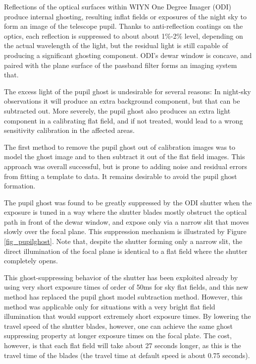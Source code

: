 \documentclass[draft]{spieman}
\begin{document}
Reflections of the optical surfaces within WIYN One Degree Imager (ODI) produce
internal ghosting, resulting inflat fields or exposures of the night sky to form
an image of the telescope pupil. Thanks to anti-reflection coatings on the
optics, each reflection is suppressed to about about 1\%-2\% level, depending on
the actual wavelength of the light, but the residual light is still capable of
producing a significant ghosting component. ODI’s dewar window is concave, and
paired with the plane surface of the passband filter forms an imaging system
that.

The excess light of the pupil ghost is undesirable for several reasons: In
night-sky observations it will produce an extra background component, but that
can be subtracted out. More severely, the pupil ghost also produces an extra
light component in a calibrating flat field, and if not treated, would lead to a
wrong sensitivity calibration in the affected areas.

The first method to remove the pupil ghost out of calibration images was to
model the ghost image and to then subtract it out of the flat field images. This
approach was overall successful, but is prone to adding noise and residual
errors from fitting a template to data. It remains desirable to avoid the pupil
ghost formation.

The pupil ghost was found to be greatly suppressed by the ODI shutter when the
exposure is tuned in a way where the shutter blades mostly obstruct the optical
path in front of the dewar window, and expose only via a narrow slit that moves
slowly over the focal plane. This suppression mechanism is illustrated by Figure
\ref{fig_pupilghost}. Note that, despite the shutter forming only a narrow slit,
the direct illumination of the focal plane is identical to a flat field where
the shutter completely opens.

This ghost-suppressing behavior of the shutter has been exploited already by
using very short exposure times of order of 50ms for sky flat fields, and this
new method has replaced the pupil ghost model subtraction method. However,
 this method was applicable only for situations with a very
bright flat field illumination that would support extremely short exposure
times. By lowering the travel speed of the shutter blades, however, one can
achieve the same ghost suppressing property at longer exposure times on the
focal plate. The cost, however, is that each flat field will take about 27
seconds longer, as this is the travel time of the blades (the travel time at
default speed is about 0.75 seconds).
\end{document}
